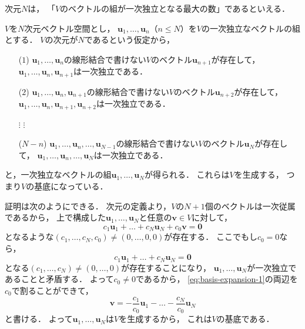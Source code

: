\documentclass[
]{sotsu}
\begin{document}
次元$N$は，
「$V$のベクトルの組が一次独立となる最大の数」であるといえる．

\quad 
$V$を$N$次元ベクトル空間とし，
$\symbf{u}_1, \dots, \symbf{u}_n$（$n \leq N$）を$V$の一次独立なベクトルの組とする．
$V$の次元が$N$であるという仮定から，
\begin{enumerate}[leftmargin={6em}]
    \item[($1$) ] $\symbf{u}_1, \dots, \symbf{u}_n$の線形結合で書けない$V$のベクトル$\symbf{u}_{n+1}$が存在して，
        $\symbf{u}_1, \dots, \symbf{u}_n, \symbf{u}_{n+1}$は一次独立である．
    \item[($2$) ] $\symbf{u}_1, \dots, \symbf{u}_n, \symbf{u}_{n+1}$の線形結合で書けない$V$のベクトル$\symbf{u}_{n+2}$が存在して，
        $\symbf{u}_1, \dots, \symbf{u}_n, \symbf{u}_{n+1}, \symbf{u}_{n+2}$は一次独立である．
    \item[$\vdots$\hspace{1ex} ] \hspace{0.4\linewidth} $\vdots$
    \item[($N-n$) ] $\symbf{u}_1, \dots, \symbf{u}_n, \dots, \symbf{u}_{N-1}$の線形結合で書けない$V$のベクトル$\symbf{u}_N$が存在して，
        $\symbf{u}_1, \dots, \symbf{u}_n, \dots, \symbf{u}_N$は一次独立である．
\end{enumerate}
と，一次独立なベクトルの組$\symbf{u}_1, \dots, \symbf{u}_N$が得られる．
これらは$V$を生成する，
つまり$V$の基底になっている．

証明は次のようにできる．
次元の定義より，$V$の$N + 1$個のベクトルは一次従属であるから，
上で構成した$\symbf{u}_1, \dots, \symbf{u}_N$と任意の$\symbf{v} \in V$に対して，
\begin{equation}
    \label{eq:basis-expansion-1}
    c_1 \symbf{u}_1 + \dots + c_N \symbf{u}_N + c_0 \symbf{v} = \symbf{0}
\end{equation}
となるような$(c_1, \dots, c_N, c_0) \neq (0, \dots, 0, 0)$が存在する．
ここでもし$c_0 = 0$なら，
\begin{equation*}
    c_1 \symbf{u}_1 + \dots + c_N \symbf{u}_N = \symbf{0}
\end{equation*}
となる$(c_1, \dots, c_N) \neq (0, \dots, 0)$が存在することになり，
$\symbf{u}_1, \dots, \symbf{u}_N$が一次独立であることと矛盾する．
よって$c_0 \neq 0$であるから，
\cref{eq:basis-expansion-1}の両辺を$c_0$で割ることができて，
\begin{equation*}
    \symbf{v} = -\frac{c_1}{c_0} \symbf{u}_1 - \dots - \frac{c_N}{c_0} \symbf{u}_N
\end{equation*}
と書ける．
よって$\symbf{u}_1, \dots, \symbf{u}_N$は$V$を生成するから，
これは$V$の基底である．\qedsymbol
\end{document}
